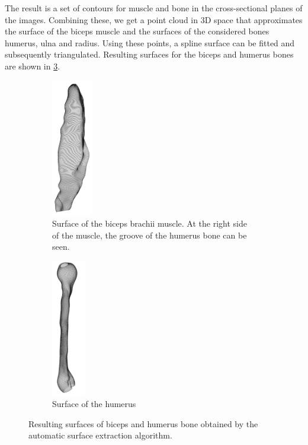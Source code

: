 The result is a set of contours for muscle and bone in the cross-sectional planes of the images. Combining these, we get a point cloud in 3D space that approximates the surface of the biceps muscle and the surfaces of the considered bones humerus, ulna and radius. Using these points, a spline surface can be fitted and subsequently triangulated. Resulting surfaces for the biceps and humerus bones are shown in \cref{fig:extraction_result}.
%
\begin{figure}%
  \centering%
  \begin{subfigure}[t]{0.48\textwidth}%
    \centering%
    \includegraphics[height=6cm]{images/fiber_creation/extraction_biceps.png}%
    \caption{Surface of the biceps brachii muscle. At the right side of the muscle, the groove of the humerus bone can be seen.}%
    \label{fig:extraction_result_biceps}%
  \end{subfigure}
  \begin{subfigure}[t]{0.48\textwidth}%
    \centering%
    \includegraphics[height=6cm]{images/fiber_creation/extraction_humerus00.png}%
    \caption{Surface of the humerus}%
    \label{fig:extraction_result_humerus}%
  \end{subfigure}    
  \caption{Resulting surfaces of biceps and humerus bone obtained by the automatic surface extraction algorithm.}%
  \label{fig:extraction_result}%
\end{figure}%

